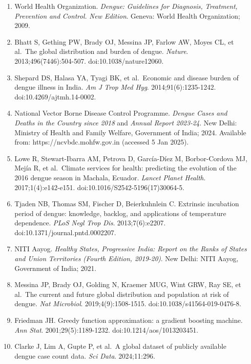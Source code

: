 \documentclass[
  10pt,
  twocolumn]{article}
\providecommand{\tightlist}{%
  \setlength{\itemsep}{0pt}\setlength{\parskip}{0pt}}
\begin{document}
\begin{enumerate}
\def\labelenumi{\arabic{enumi}.}
\tightlist
\item
  World Health Organization. \emph{Dengue: Guidelines for Diagnosis,
  Treatment, Prevention and Control. New Edition}. Geneva: World Health
  Organization; 2009.
\item
  Bhatt S, Gething PW, Brady OJ, Messina JP, Farlow AW, Moyes CL, et
  al.~The global distribution and burden of dengue. \emph{Nature}.
  2013;496(7446):504-507. doi:10.1038/nature12060.
\item
  Shepard DS, Halasa YA, Tyagi BK, et al.~Economic and disease burden of
  dengue illness in India. \emph{Am J Trop Med Hyg}.
  2014;91(6):1235-1242. doi:10.4269/ajtmh.14-0002.
\item
  National Vector Borne Disease Control Programme. \emph{Dengue Cases
  and Deaths in the Country since 2018} and \emph{Annual Report
  2023-24}. New Delhi: Ministry of Health and Family Welfare, Government
  of India; 2024. Available from: https://ncvbdc.mohfw.gov.in (accessed
  5 Jan 2025).
\item
  Lowe R, Stewart-Ibarra AM, Petrova D, García-Díez M, Borbor-Cordova
  MJ, Mejía R, et al.~Climate services for health: predicting the
  evolution of the 2016 dengue season in Machala, Ecuador. \emph{Lancet
  Planet Health}. 2017;1(4):e142-e151.
  doi:10.1016/S2542-5196(17)30064-5.
\item
  Tjaden NB, Thomas SM, Fischer D, Beierkuhnlein C. Extrinsic incubation
  period of dengue: knowledge, backlog, and applications of temperature
  dependence. \emph{PLoS Negl Trop Dis}. 2013;7(6):e2207.
  doi:10.1371/journal.pntd.0002207.
\item
  NITI Aayog. \emph{Healthy States, Progressive India: Report on the
  Ranks of States and Union Territories (Fourth Edition, 2019-20)}. New
  Delhi: NITI Aayog, Government of India; 2021.
\item
  Messina JP, Brady OJ, Golding N, Kraemer MUG, Wint GRW, Ray SE, et
  al.~The current and future global distribution and population at risk
  of dengue. \emph{Nat Microbiol}. 2019;4(9):1508-1515.
  doi:10.1038/s41564-019-0476-8.
\item
  Friedman JH. Greedy function approximation: a gradient boosting
  machine. \emph{Ann Stat}. 2001;29(5):1189-1232.
  doi:10.1214/aos/1013203451.
\item
  Clarke J, Lim A, Gupte P, et al.~A global dataset of publicly
  available dengue case count data. \emph{Sci Data}. 2024;11:296.

\end{enumerate}
\end{document}
